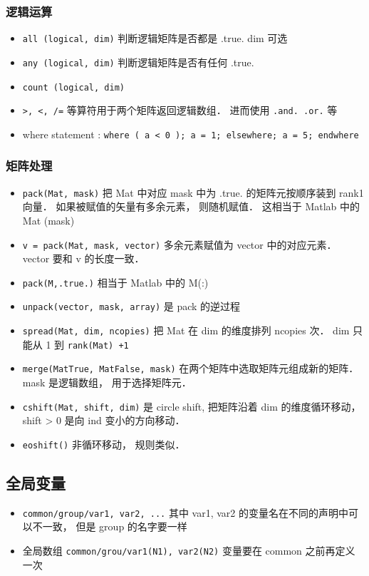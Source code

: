 \subsubsection{逻辑运算}
\begin{itemize}
\item \verb`all (logical, dim)` 判断逻辑矩阵是否都是 .true.  dim 可选
\item \verb`any (logical, dim)` 判断逻辑矩阵是否有任何 .true.
\item \verb`count (logical, dim) `
\item \verb`>, <, /=` 等算符用于两个矩阵返回逻辑数组． 进而使用 \verb`.and. .or.` 等
\item where statement : 
\verb`where ( a < 0 ); a = 1; elsewhere; a = 5; endwhere`
\end{itemize}

\subsubsection{矩阵处理}
\begin{itemize}
\item \verb`pack(Mat, mask)` 把 Mat 中对应 mask 中为 .true. 的矩阵元按顺序装到 rank1 向量． 如果被赋值的矢量有多余元素， 则随机赋值． 这相当于 Matlab 中的 Mat (mask)
\item \verb`v = pack(Mat, mask, vector)` 多余元素赋值为 vector 中的对应元素． vector 要和 v 的长度一致．
\item \verb`pack(M,.true.)` 相当于 Matlab 中的 M(:)
\item \verb`unpack(vector, mask, array)` 是 pack 的逆过程
\item \verb`spread(Mat, dim, ncopies)` 把 Mat 在 dim 的维度排列 ncopies 次． dim 只能从 1 到 \verb`rank(Mat) +1`
\item \verb`merge(MatTrue, MatFalse, mask)` 在两个矩阵中选取矩阵元组成新的矩阵． mask 是逻辑数组， 用于选择矩阵元．
\item \verb`cshift(Mat, shift, dim)` 是 circle shift, 把矩阵沿着 dim 的维度循环移动， shift > 0 是向 ind 变小的方向移动．
\item \verb`eoshift()` 非循环移动， 规则类似．
\end{itemize}

\subsection{全局变量}
\begin{itemize}
\item \verb`common/group/var1, var2, ...` 其中 var1, var2 的变量名在不同的声明中可以不一致， 但是 group 的名字要一样
\item 全局数组 \verb`common/grou/var1(N1), var2(N2)` 变量要在 common 之前再定义一次
\end{itemize}

